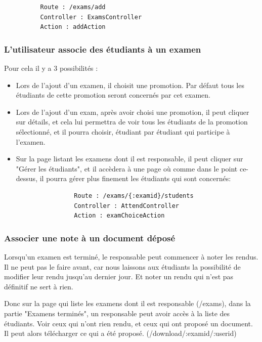 \documentclass{report}
\begin{document}
        \begin{verbatim}
          Route : /exams/add
          Controller : ExamsController
          Action : addAction
        \end{verbatim}
      \subsubsection{L'utilisateur associe des étudiants à un examen}
        Pour cela il y a 3 possibilités :

        \begin{itemize}
          \item{
              Lors de l'ajout d'un examen, il choisit une promotion. Par défaut
              tous les étudiants de cette promotion seront concernés par cet
              examen.
            }
          \item{
              Lors de l'ajout d'un exam, après avoir choisi une promotion, il peut
              cliquer sur détails, et cela lui permettra de voir tous les étudiants
              de la promotion sélectionné, et il pourra choisir, étudiant par
              étudiant qui participe à l'examen.
            }
          \item{
              Sur la page listant les examens dont il est responsable, il peut
              cliquer sur "Gérer les étudiants", et il accèdera à une page où
              comme dans le point ce-dessus, il pourra gérer plus finement les
              étudiants qui sont concernés:
              \vspace{1em}
              \begin{verbatim}
                Route : /exams/{:examid}/students
                Controller : AttendController
                Action : examChoiceAction
              \end{verbatim}
            }
        \end{itemize}
      \subsubsection{Associer une note à un document déposé}
        Lorsqu'un examen est terminé, le responsable peut commencer à noter les rendus.
        Il ne peut pas le faire avant, car nous laissons aux étudiants la possibilité
        de modifier leur rendu jusqu'au dernier jour. Et noter un rendu qui n'est pas
        définitif ne sert à rien.

        Donc sur la page qui liste les examens dont il est responsable
        (/exams), dans la partie "Examens terminés",
        un responsable peut avoir accès à la liste des étudiants. Voir ceux qui
        n'ont rien rendu, et ceux qui ont proposé un document. Il peut alors
        télécharger ce qui a été proposé. 
        (/download/{:examid}/{:userid})
\end{document}
